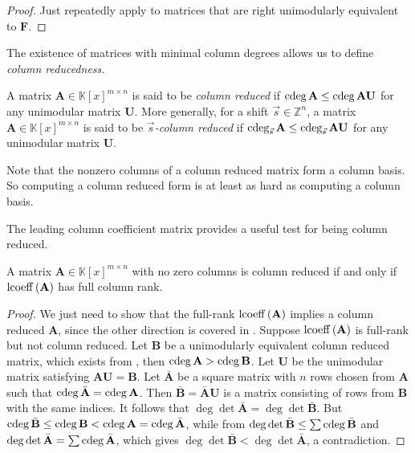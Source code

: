\begin{proof}
Just repeatedly apply  to matrices
that are right unimodularly equivalent to $\mathbf{F}$. 
\end{proof}
The existence of matrices with minimal column degrees allows us to
define \emph{column reducedness.}
\begin{defn}
A matrix $\mathbf{A}\in\mathbb{K}\left[x\right]^{m\times n}$ is said
to be \emph{column reduced} if $\cdeg\mathbf{A}\le\cdeg\mathbf{A}\mathbf{U}$
for any unimodular matrix $\mathbf{U}$. More generally, for a shift
$\vec{s}\in\mathbb{Z}^{n}$, a matrix $\mathbf{A}\in\mathbb{K}\left[x\right]^{m\times n}$
is said to be $\vec{s}$\emph{-column reduced} if $\cdeg_{\vec{s}}\mathbf{A}\le\cdeg_{\vec{s}}\mathbf{A}\mathbf{U}$
for any unimodular matrix $\mathbf{U}$.

Note that the nonzero columns of a column reduced matrix form a column
basis. So computing a column reduced form is at least as hard as computing
a column basis.

The leading column coefficient matrix provides a useful test for being
column reduced.\end{defn}
\begin{lem}
\label{lem:columnReducedLeadingCoefficient}A matrix $\mathbf{A}\in\mathbb{K}\left[x\right]^{m\times n}$
with no zero columns is column reduced if and only if \textup{$\operatorname{lcoeff}\left(\mathbf{A}\right)$
has full column rank.}\end{lem}
\begin{proof}
We just need to show that the full-rank $\operatorname{lcoeff}\left(\mathbf{A}\right)$
implies a column reduced $\mathbf{A}$, since the other direction
is covered in . Suppose
$\operatorname{lcoeff}\left(\mathbf{A}\right)$ is full-rank but not column reduced.
Let $\mathbf{B}$ be a unimodularly equivalent column reduced matrix,
which exists from ,
then $\cdeg\mathbf{A}>\cdeg\mathbf{B}$. Let $\mathbf{U}$ be the
unimodular matrix satisfying $\mathbf{A}\mathbf{U}=\mathbf{B}$. Let
$\bar{\mathbf{A}}$ be a square matrix with $n$ rows chosen from
$\mathbf{A}$ such that $\cdeg\bar{\mathbf{A}}=\cdeg\mathbf{A}$.
Then $\bar{\mathbf{B}}=\bar{\mathbf{A}}\mathbf{U}$ is a matrix consisting
of rows from $\mathbf{B}$ with the same indices. It follows that
$\deg\det\bar{\mathbf{A}}=\deg\det\bar{\mathbf{B}}$. But $\cdeg\bar{\mathbf{B}}\le\cdeg\mathbf{B}<\cdeg\mathbf{A}=\cdeg\bar{\mathbf{A}}$,
while from 
$\deg\det\bar{\mathbf{B}}\le\sum\cdeg\bar{\mathbf{B}}$ and $\deg\det\bar{\mathbf{A}}=\sum\cdeg\bar{\mathbf{A}}$,
which gives $\deg\det\bar{\mathbf{B}}<\deg\det\bar{\mathbf{A}}$,
a contradiction.
\end{proof}
